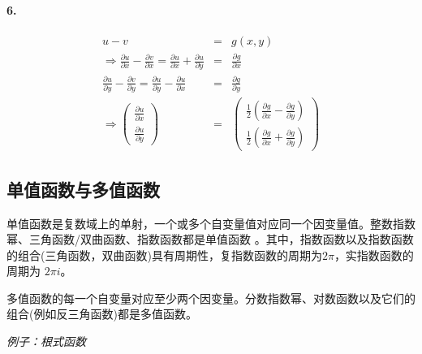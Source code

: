 \documentclass[UTF8]{ctexart}
\newcommand{\tmtextit}[1]{{\itshape{#1}}}
\begin{document}
\paragraph{6.}

\begin{eqnarray*}
  u - v & = & g (x, y)\\
  \Rightarrow \frac{\partial u}{\partial x} - \frac{\partial v}{\partial x} =
  \frac{\partial u}{\partial x} + \frac{\partial u}{\partial y} & = &
  \frac{\partial g}{\partial x}\\
  \frac{\partial u}{\partial y} - \frac{\partial v}{\partial y} =
  \frac{\partial u}{\partial y} - \frac{\partial u}{\partial x} & = &
  \frac{\partial g}{\partial y}\\
  \Rightarrow \left(\begin{array}{c}
    \frac{\partial u}{\partial x}\\
    \frac{\partial u}{\partial y}
  \end{array}\right) & = & \left(\begin{array}{c}
    \frac{1}{2} \left( \frac{\partial g}{\partial x} - \frac{\partial
    g}{\partial y} \right)\\
    \frac{1}{2} \left( \frac{\partial g}{\partial x} + \frac{\partial
    g}{\partial y} \right)
  \end{array}\right)
\end{eqnarray*}
\subsection{单值函数与多值函数}

单值函数是复数域上的单射，一个或多个自变量值对应同一个因变量值。整数指数幂、三角函数/双曲函数、指数函数都是单值函数
。其中，指数函数以及指数函数的组合(三角函数，双曲函数)具有周期性，复指数函数的周期为$2\pi$，实指数函数的周期为
$2 \pi i$。

多值函数的每一个自变量对应至少两个因变量。分数指数幂、对数函数以及它们的组合(例如反三角函数)都是多值函数。

\tmtextit{例子：根式函数}
\end{document}
